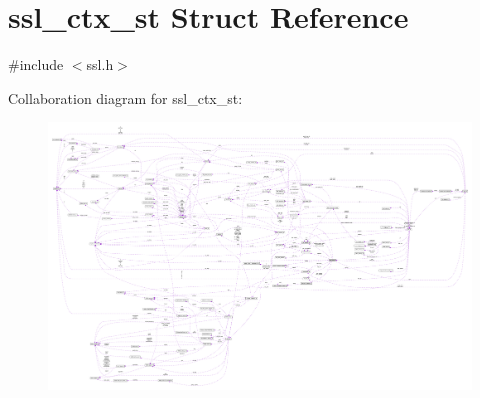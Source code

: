 \hypertarget{structssl__ctx__st}{}\section{ssl\+\_\+ctx\+\_\+st Struct Reference}
\label{structssl__ctx__st}


{\ttfamily \#include $<$ssl.\+h$>$}



Collaboration diagram for ssl\+\_\+ctx\+\_\+st\+:\nopagebreak
\begin{figure}[H]
\begin{center}
\leavevmode
\includegraphics[width=350pt]{structssl__ctx__st__coll__graph}
\end{center}
\end{figure}
